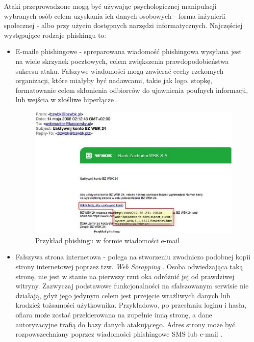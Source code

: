 \documentclass[12pt,twoside]{article}
\begin{document}
Ataki przeprowadzone mogą być używając psychologicznej manipulacji wybranych osób celem uzyskania ich danych osobowych - forma inżynierii społecznej - albo przy użyciu dostępnych narzędzi informatycznych. Najczęściej występujące rodzaje phishingu to:

\begin{itemize}
	\item E-maile phishingowe - spreparowana wiadomość phishingowa wysyłana jest na wiele skrzynek pocztowych, celem zwiększenia prawdopodobieństwa sukcesu ataku. Fałszywe wiadomości mogą zawierać cechy rzekomych organizacji, które miałyby być nadawcami, takie jak logo, stopkę, formatowanie celem skłonienia odbiorców do ujawnienia poufnych informacji, lub wejścia w złośliwe hiperłącze \cite{PhishingEmails}. 
	
	\begin{figure}[H]
		\centering
		\includegraphics[width=1\linewidth]{figures/phishing-example}
		\caption{Przykład phishingu w formie wiadomości e-mail \cite{PhishingExample}}
		\label{fig:phishing-example}
		
	\end{figure}
	
	\item Fałszywa strona internetowa - polega na stworzeniu zwodniczo podobnej kopii strony internetowej poprzez tzw. \emph{Web Scrapping} \cite{WebScrapping} . Osoba odwiedzająca taką stronę, nie jest w stanie na pierwszy rzut oka odróżnić jej od prawdziwej witryny. Zazwyczaj podstawowe funkcjonalności na sfałszowanym serwisie nie działają, gdyż jego jedynym celem jest przejęcie wrażliwych danych lub kradzież tożsamości użytkownika. Przykładowo, po przesłaniu loginu i hasła, ofiara może zostać przekierowana na zupełnie inną stronę, a dane autoryzacyjne trafią do bazy danych atakującego. Adres strony może być rozpowszechniany poprzez wiadomości phishingowe SMS lub e-mail \cite{WhatIsPhishing}. 
	

\end{itemize}
\end{document}
